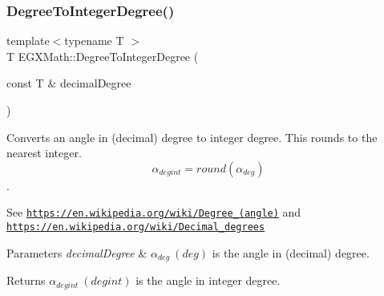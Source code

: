 \subsubsection{\texorpdfstring{Degree\+To\+Integer\+Degree()}{DegreeToIntegerDegree()}}
{\footnotesize\ttfamily template$<$typename T $>$ \\
T E\+G\+X\+Math\+::\+Degree\+To\+Integer\+Degree (\begin{DoxyParamCaption}\item[{const T \&}]{decimal\+Degree }\end{DoxyParamCaption})}



Converts an angle in (decimal) degree to integer degree. This rounds to the nearest integer. \[\alpha_{deg int}=round(\alpha_{deg})\]. 

See \href{https://en.wikipedia.org/wiki/Degree_(angle)}{\tt https\+://en.\+wikipedia.\+org/wiki/\+Degree\+\_\+(angle)} and \href{https://en.wikipedia.org/wiki/Decimal_degrees}{\tt https\+://en.\+wikipedia.\+org/wiki/\+Decimal\+\_\+degrees} 
\begin{DoxyParams}{Parameters}
{\em decimal\+Degree} & $\alpha_{deg}\ (deg)$ is the angle in (decimal) degree. \\
\hline
\end{DoxyParams}
\begin{DoxyReturn}{Returns}
$\alpha_{deg int}\ (deg int)$ is the angle in integer degree. 
\end{DoxyReturn}
